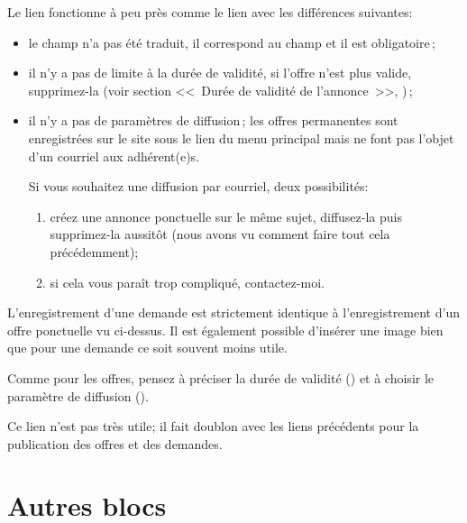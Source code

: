 Le lien  fonctionne à peu près comme le lien  avec les différences suivantes:
\begin{itemize}
    \item le champ  n’a pas été traduit, il correspond au champ  et il est obligatoire\,;
    \item {}il n’y a pas de limite à la durée de validité, si l’offre n’est plus valide, supprimez-la (voir section  <<~Durée de validité de l'annonce~>>, )\,;
    \item {}il n’y a pas de paramètres de diffusion\,; les offres permanentes sont enregistrées sur le site sous le lien  du menu principal mais ne font pas l’objet d’un courriel aux adhérent(e)s.
    
    Si vous souhaitez une diffusion par courriel, deux possibilités:
    \begin{enumerate}
        \item créez une annonce ponctuelle sur le même sujet, diffusez-la puis supprimez-la aussitôt (nous avons vu comment faire tout cela précédemment);
        \item si cela vous paraît trop compliqué, contactez-moi.
    \end{enumerate}
\end{itemize}

L’enregistrement d’une demande est strictement identique à l’enregistrement d’un offre ponctuelle vu ci-dessus. Il est également possible d’insérer une image bien que pour une demande ce soit souvent moins  utile.

Comme pour les offres, pensez à préciser la durée de validité () et à choisir le paramètre de diffusion ().


Ce lien n’est pas très utile; il fait doublon avec les liens précédents pour la publication des offres et des demandes.

\section{Autres blocs}

